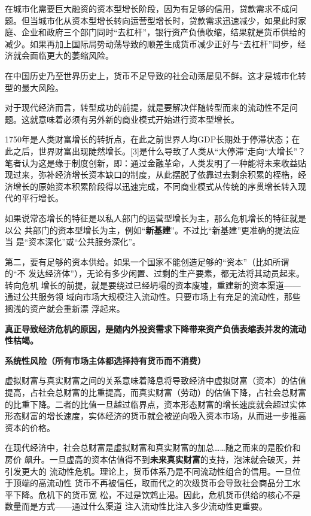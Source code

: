 在城市化需要巨大融资的资本型增长阶段，因为有足够的信用，贷款需求不成问题。但当城市化从资本型增长转向运营型增长时，贷款需求迅速减少，如果此时家庭、企业和政府三个部门同时“去杠杆”，银行资产负债收缩，结果就是货币供给的减少。如果再加上国际局势动荡导致的顺差生成货币减少正好与“去杠杆”同步，经济就会面临更大的萎缩风险。

在中国历史乃至世界历史上，货币不足导致的社会动荡屡见不鲜。这才是城市化转型的最大风险。

对于现代经济而言，转型成功的前提，就是要解决伴随转型而来的流动性不足问题。这就意味着必须有另外新的商业模式开始进行资本型增长。


1750年是人类财富增长的转折点，在此之前世界人均GDP长期处于停滞状态；在此之后，世界财富出现陡然增长。[3]是什么导致了人类从“大停滞”走向“大增长”？笔者认为这是缘于制度创新，即：通过金融革命，人类发明了一种能将未来收益贴现过来，弥补经济增长资本缺口的制度，从此摆脱了依靠过去剩余积累的桎梏，经济增长的原始资本积累阶段得以迅速完成，不同商业模式从传统的序贯增长转入现代的平行增长。

如果说常态增长的特征是以私人部门的运营型增长为主，那么危机增长的特征就是以公
共部门的资本型增长为主，例如“\textbf{新基建}”。不过比“新基建”更准确的提法应当
是“资本深化”或“公共服务深化”。

第二，要有足够的资本供给。如果一个国家不能创造足够的“资本”（比如所谓的“不
发达经济体”），无论有多少闲置、过剩的生产要素，都无法将其动员起来。转向危机
增长的前提，就是要绕过已经坍塌的资本废墟，重建新的资本渠道——通过公共服务领
域向市场大规模注入流动性。只要市场上有充足的流动性，那些搁浅的资产就会重新漂
浮起来。

\textbf{真正导致经济危机的原因，是随内外投资需求下降带来资产负债表缩表并发的流动性枯竭。}

\textbf{系统性风险（所有市场主体都选择持有货币而不消费）}

虚拟财富与真实财富之间的关系意味着降息将导致经济中虚拟财富（资本）的估值提高，占社会总财富的比重提高，而真实财富（劳动）的估值下降，占社会总财富的比重下降。二者的比值一旦越过临界点，资本形态财富的增长速度就会超过实体形态财富的增长速度，实体经济的货币就会被逆向吸入资本市场，从而进一步推高资本的价格。

在现代经济中，社会总财富是虚拟财富和真实财富的加总……随之而来的是股价和房价
飙升。一旦虚高的资本估值得不到\textbf{未来真实财富}的支持，泡沫就会破灭，并引发更大的
流动性危机。理论上，货币体系乃是不同流动性组合的信用。一旦位于顶端的高流动性
货币不再被信任，取而代之的次级货币会导致社会商品分工水平下降。危机下的货币宽
松，不过是饮鸩止渴。因此，危机货币供给的核心不是数量而是方式——通过什么渠道
注入流动性比注入多少流动性更重要。

